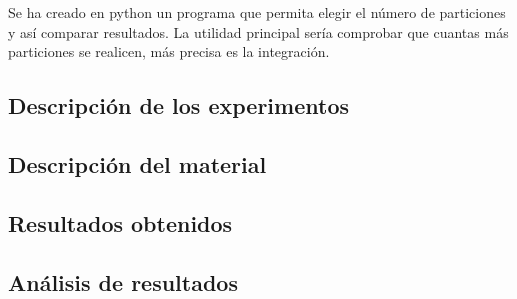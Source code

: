 \documentclass{article}
\begin{document}
   Se ha creado en python un programa que permita elegir el número de particiones y así comparar resultados. La utilidad principal sería comprobar que cuantas más particiones se realicen, más precisa es la integración.

    
    \subsection{Descripción de los experimentos}

    \subsection{Descripción del material}

    \subsection{Resultados obtenidos}

    \subsection{Análisis de resultados}

   \pagebreak

\end{document}
